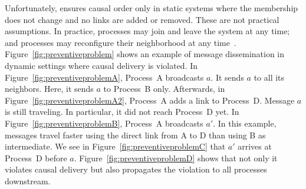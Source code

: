 \begin{figure*}
  \begin{center}
    \hspace{20pt}
    \hspace{20pt}
    \hspace{20pt}
    \hspace{20pt}
    \caption{\label{fig:preventiveproblem}Causal
      broadcast~\cite{friedman2004causal} may violate causal order in dynamic
      settings.}
  \end{center}
\end{figure*}


Unfortunately, \cite{friedman2004causal} ensures causal order only in static
systems where the membership does not change and no links are added or
removed. These are not practical assumptions.  In practice, processes may join
and leave the system at any time; and processes may reconfigure their
neighborhood at any time~\cite{nedelec2016crate}.
Figure~\ref{fig:preventiveproblem} shows an example of message dissemination in
dynamic settings where causal delivery is violated. In
Figure~\ref{fig:preventiveproblemA}, Process~A broadcasts $a$. It sends $a$ to
all its neighbors. Here, it sends $a$ to Process~B only.  Afterwards, in
Figure~\ref{fig:preventiveproblemA2}, Process~A adds a link to
Process~D. Message $a$ is still traveling. In particular, it did not reach
Process~D yet. In Figure~\ref{fig:preventiveproblemB}, Process~A broadcasts
$a'$. In this example, messages travel faster using the direct link from A to D
than using B as intermediate.  We see in Figure~\ref{fig:preventiveproblemC}
that $a'$ arrives at Process~D before $a$. Figure~\ref{fig:preventiveproblemD}
shows that not only it violates causal delivery but also propagates the
violation to all processes downstream.

